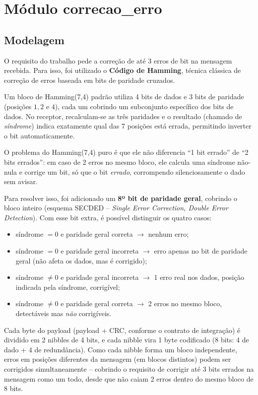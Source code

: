 ﻿%
\section{Módulo correcao\_erro}

\subsection{Modelagem}

O requisito do trabalho pede a correção de até 3 erros de bit na mensagem recebida.
Para isso, foi utilizado o \textbf{Código de Hamming}, técnica clássica de correção de
erros baseada em bits de paridade cruzados.

Um bloco de Hamming(7,4) padrão utiliza 4 bits de dados e 3 bits de paridade
(posições $1, 2$ e $4$), cada um cobrindo um subconjunto específico dos bits de dados.
No receptor, recalculam-se as três paridades e o resultado (chamado de \emph{síndrome})
indica exatamente qual das 7 posições está errada, permitindo inverter o bit
automaticamente.

O problema do Hamming(7,4) puro é que ele não diferencia ``1 bit errado'' de
``2 bits errados'': em caso de 2 erros no mesmo bloco, ele calcula uma síndrome
não-nula e corrige um bit, só que o bit \emph{errado}, corrompendo silenciosamente
o dado sem avisar.

Para resolver isso, foi adicionado um \textbf{8º bit de paridade geral}, cobrindo o
bloco inteiro (esquema SECDED -- \emph{Single Error Correction, Double Error
Detection}). Com esse bit extra, é possível distinguir os quatro casos:

\begin{itemize}
  \item síndrome $= 0$ e paridade geral correta $\rightarrow$ nenhum erro;
  \item síndrome $= 0$ e paridade geral incorreta $\rightarrow$ erro apenas no bit de
        paridade geral (não afeta os dados, mas é corrigido);
  \item síndrome $\neq 0$ e paridade geral incorreta $\rightarrow$ 1 erro real nos dados,
        posição indicada pela síndrome, corrigível;
  \item síndrome $\neq 0$ e paridade geral correta $\rightarrow$ 2 erros no mesmo bloco,
        detectáveis mas \emph{não} corrigíveis.
\end{itemize}

Cada byte do payload (payload + CRC, conforme o contrato de integração) é dividido em
2 nibbles de 4 bits, e cada nibble vira 1 byte codificado (8 bits: 4 de dado + 4 de
redundância). Como cada nibble forma um bloco independente, erros em posições
diferentes da mensagem (em blocos distintos) podem ser corrigidos simultaneamente --
cobrindo o requisito de corrigir até 3 bits errados na mensagem como um todo, desde
que não caiam 2 erros dentro do mesmo bloco de 8 bits.

